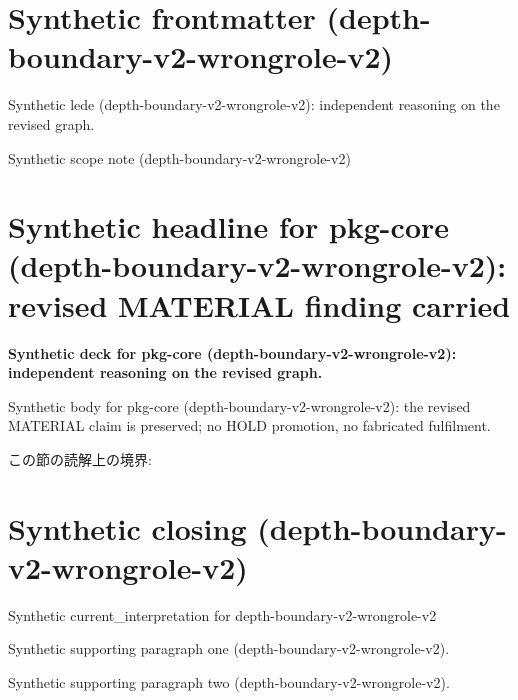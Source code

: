 \documentclass[lualatex,a4paper,10pt]{jlreq}
\begin{document}
\surveycover
\clearpage
\section*{Synthetic frontmatter (depth-boundary-v2-wrongrole-v2)}
Synthetic lede (depth-boundary-v2-wrongrole-v2): independent reasoning on the revised graph.

\begin{claimboundary}
\noindent Synthetic scope note (depth-boundary-v2-wrongrole-v2)\par
\end{claimboundary}
\clearpage
\twocolumn
\section{Synthetic headline for pkg-core (depth-boundary-v2-wrongrole-v2): revised MATERIAL finding carried}
\label{pkg:pkg-core}
\noindent\textbf{Synthetic deck for pkg-core (depth-boundary-v2-wrongrole-v2): independent reasoning on the revised graph.} \cite{w2026-W33target-source}\par\medskip
\noindent Synthetic body for pkg-core (depth-boundary-v2-wrongrole-v2): the revised MATERIAL claim is preserved; no HOLD promotion, no fabricated fulfilment.\par\medskip
\begin{claimboundary}
この節の読解上の境界: 
\end{claimboundary}
\clearpage
\onecolumn
\section{Synthetic closing (depth-boundary-v2-wrongrole-v2)}
\label{sec:issue-summary}
\noindent Synthetic current\_interpretation for depth-boundary-v2-wrongrole-v2\par\medskip
\noindent Synthetic supporting paragraph one (depth-boundary-v2-wrongrole-v2).\par\medskip
\noindent Synthetic supporting paragraph two (depth-boundary-v2-wrongrole-v2).\par\medskip
\clearpage
\onecolumn
\printbibliography[title={References / Source Notes}]
\end{document}
